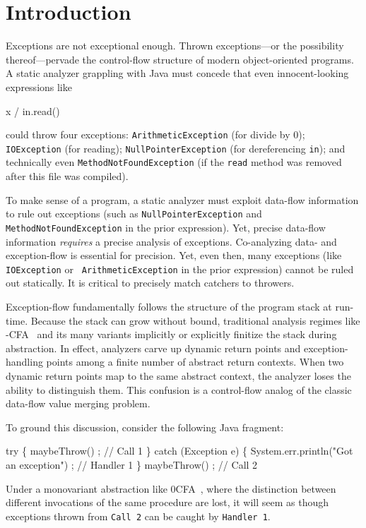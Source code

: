 

\section{Introduction}


Exceptions are not exceptional enough.
Thrown exceptions---or the possibility thereof---pervade the control-flow
structure of modern object-oriented programs.
A static analyzer grappling with
Java must concede that even
innocent-looking expressions like 
\begin{code}
 x / in.read() 
\end{code}
could throw four exceptions: 
{\tt ArithmeticException} (for divide by 0);
{\tt IOException} (for reading);
{\tt NullPointerException} (for dereferencing {\tt in});
and technically even
{\tt MethodNotFoundException} (if
the {\tt read} method
was removed after this file was compiled).

To make sense of a program, a static analyzer must exploit data-flow
information to rule out exceptions (such as {\tt NullPointerException} and {\tt
MethodNotFoundException} in the prior expression).
Yet, precise data-flow information \emph{requires} a precise analysis of
exceptions.
Co-analyzing data- and exception-flow is essential for precision.
Yet, even then, many exceptions (like {\tt IOException} or {\tt
ArithmeticException} in the prior expression) cannot be ruled out statically.
It is critical to precisely match catchers to throwers.


Exception-flow fundamentally follows the structure of the program stack at
run-time.
Because the stack can grow without bound, traditional analysis regimes like
-CFA~\cite{mattmight:Shivers:1991:CFA} and its many variants implicitly or
explicitly finitize the stack during abstraction.
In effect, analyzers carve up dynamic return points and exception-handling
points among a finite number of abstract return contexts.
When two dynamic return points map to the same abstract context, the analyzer loses
the ability to distinguish them.
This confusion 
is a control-flow analog of the classic data-flow value merging problem.

To ground this discussion, 
consider the following Java fragment:
\begin{code}
try \{
   maybeThrow() ; // Call 1
\} catch (Exception e) \{
   System.err.println("Got an exception") ; // Handler 1
\}
maybeThrow() ; // Call 2\end{code}
Under a monovariant abstraction like 0CFA~\cite{mattmight:Shivers:1991:CFA}, where the distinction between different invocations of the same procedure are lost, it will seem as though exceptions
thrown from {\tt Call 2} can be caught by {\tt Handler 1}.


